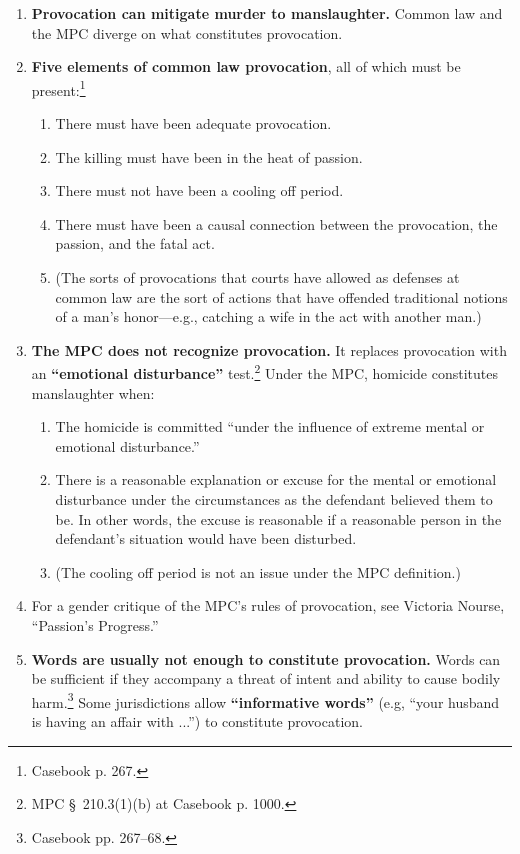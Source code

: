 \begin{enumerate}
    \item \textbf{Provocation can mitigate murder to manslaughter.} Common law 
    and the MPC diverge on what constitutes provocation.
    \item \textbf{Five elements of common law provocation}, all of which must 
    be present:\footnote{Casebook p. 267.}
    \begin{enumerate}
        \item There must have been adequate provocation.
        \item The killing must have been in the heat of passion.
        \item There must not have been a cooling off period.
        \item There must have been a causal connection between the 
        provocation, the passion, and the fatal act.
        \item (The sorts of provocations that courts have allowed as defenses 
        at common law are the sort of actions that have offended traditional 
        notions of a man's honor---e.g., catching a wife in the act with 
        another man.)
    \end{enumerate}
    \item \textbf{The MPC does not recognize provocation.} It replaces 
    provocation with an \textbf{``emotional disturbance''} test.\footnote{MPC 
    § 210.3(1)(b) at Casebook p. 1000.} Under the MPC, homicide constitutes 
    manslaughter when:
    \begin{enumerate}
        \item The homicide is committed ``under the influence of extreme 
        mental or emotional disturbance.''
        \item There is a reasonable explanation or excuse for the mental or 
        emotional disturbance under the circumstances as the defendant 
        believed them to be. In other words, the excuse is reasonable if a 
        reasonable person in the defendant's situation would have been 
        disturbed.
        \item (The cooling off period is not an issue under the MPC 
        definition.)
    \end{enumerate}
    \item For a gender critique of the MPC's rules of provocation, see 
    Victoria Nourse, ``Passion's Progress.''
    \item \textbf{Words are usually not enough to constitute provocation.} 
    Words can be sufficient if they accompany a threat of intent and ability 
    to cause bodily harm.\footnote{Casebook pp. 267--68.} Some jurisdictions 
    allow \textbf{``informative words''} (e.g, ``your husband is having an 
    affair with ...'') to constitute provocation.
\end{enumerate}

